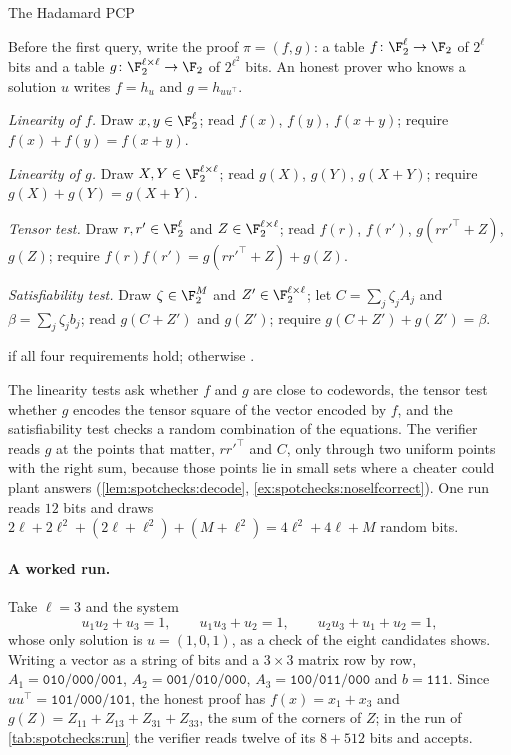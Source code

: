 \begin{refsection}
\begin{protocol}{The Hadamard PCP}\label{prot:spotchecks:hadamard}
\item[\msg{P}{V}] Before the first query, write the proof $\pi=(f,g)$: a table $f\colon\F_2^\ell\to\F_2$ of $2^\ell$ bits and a table $g\colon\F_2^{\ell\times\ell}\to\F_2$ of $2^{\ell^2}$ bits. An honest prover who knows a solution $u$ writes $f=h_u$ and $g=h_{uu^\top}$.
\item[\act{V}] \emph{Linearity of $f$.} Draw $x,y\in\F_2^\ell$; read $f(x)$, $f(y)$, $f(x+y)$; require $f(x)+f(y)=f(x+y)$.
\item[\act{V}] \emph{Linearity of $g$.} Draw $X,Y\in\F_2^{\ell\times\ell}$; read $g(X)$, $g(Y)$, $g(X+Y)$; require $g(X)+g(Y)=g(X+Y)$.
\item[\act{V}] \emph{Tensor test.} Draw $r,r'\in\F_2^\ell$ and $Z\in\F_2^{\ell\times\ell}$; read $f(r)$, $f(r')$, $g(rr'^\top+Z)$, $g(Z)$; require $f(r)f(r')=g(rr'^\top+Z)+g(Z)$.
\item[\act{V}] \emph{Satisfiability test.} Draw $\zeta\in\F_2^M$ and $Z'\in\F_2^{\ell\times\ell}$; let $C=\sum_j\zeta_jA_j$ and $\beta=\sum_j\zeta_jb_j$; read $g(C+Z')$ and $g(Z')$; require $g(C+Z')+g(Z')=\beta$.
\item[\act{V}] \acc{} if all four requirements hold; otherwise \rej.
\end{protocol}

The linearity tests ask whether $f$ and $g$ are close to codewords, the tensor test whether $g$ encodes the tensor square of the vector encoded by $f$, and the satisfiability test checks a random combination of the equations. The verifier reads $g$ at the points that matter, $rr'^\top$ and $C$, only through two uniform points with the right sum, because those points lie in small sets where a cheater could plant answers (\cref{lem:spotchecks:decode}, \cref{ex:spotchecks:noselfcorrect}). One run reads $12$ bits and draws $2\ell+2\ell^2+(2\ell+\ell^2)+(M+\ell^2)=4\ell^2+4\ell+M$ random bits.

\paragraph{A worked run.} Take $\ell=3$ and the system
\[
  u_1u_2+u_3=1,\qquad u_1u_3+u_2=1,\qquad u_2u_3+u_1+u_2=1,
\]
whose only solution is $u=(1,0,1)$, as a check of the eight candidates shows. Writing a vector as a string of bits and a $3\times3$ matrix row by row, $A_1=\texttt{010/000/001}$, $A_2=\texttt{001/010/000}$, $A_3=\texttt{100/011/000}$ and $b=\texttt{111}$. Since $uu^\top=\texttt{101/000/101}$, the honest proof has $f(x)=x_1+x_3$ and $g(Z)=Z_{11}+Z_{13}+Z_{31}+Z_{33}$, the sum of the corners of $Z$; in the run of \cref{tab:spotchecks:run} the verifier reads twelve of its $8+512$ bits and accepts.


\end{refsection}
